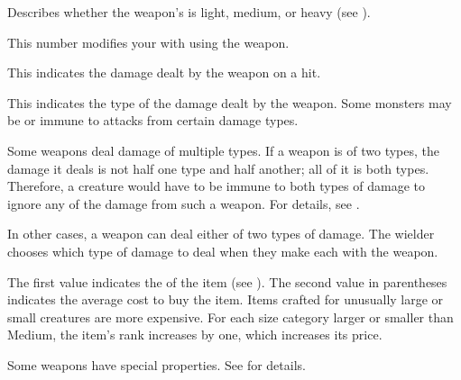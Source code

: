          Describes whether the weapon's  is light, medium, or heavy (see ).

         This number modifies your  with  using the weapon.

         This  indicates the damage dealt by the weapon on a hit.

         This indicates the type of the damage dealt by the weapon.
        Some monsters may be  or immune to attacks from certain damage types.

        Some weapons deal damage of multiple types. If a weapon is of two types, the damage it deals is not half one type and half another; all of it is both types.
        Therefore, a creature would have to be immune to both types of damage to ignore any of the damage from such a weapon.
        For details, see .

        In other cases, a weapon can deal either of two types of damage.
        The wielder chooses which type of damage to deal when they make each  with the weapon.

         The first value indicates the  of the item (see ).
        The second value in parentheses indicates the average cost to buy the item.
        Items crafted for unusually large or small creatures are more expensive.
        For each size category larger or smaller than Medium, the item's rank increases by one, which increases its price.

         Some weapons have special properties. See  for details.

